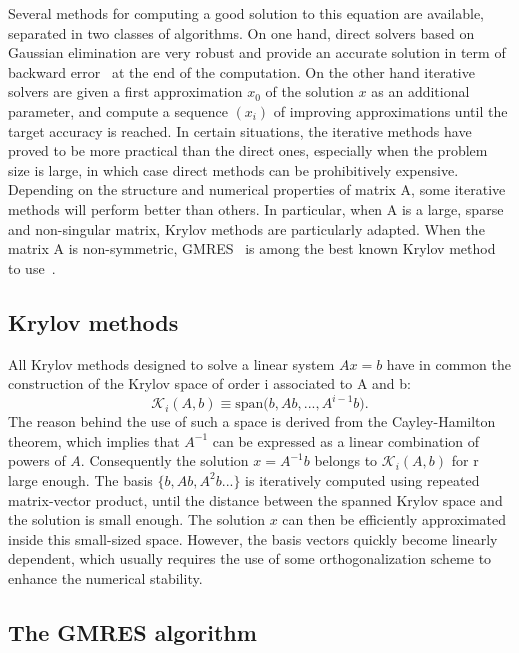 \documentclass[twoside]{article}
\begin{document}
Several methods for computing a good solution to this equation are available, separated in two classes of algorithms. On one hand, direct solvers based on Gaussian elimination \cite{direct_solver} are very robust and provide an accurate solution in term of backward error~\cite{hig:02} 
at the end of the computation. On the other hand iterative solvers are given a first approximation $x_0$ of the solution $x$ as an additional parameter, and compute a sequence $(x_i)$ of improving approximations until the target accuracy is reached. In certain situations, the iterative methods have proved to be more practical than the direct ones, especially when the problem size is large, in which case direct methods can be prohibitively expensive. Depending on the structure and numerical properties of matrix A, some iterative methods will perform better than others. In particular, when A is a large, sparse and non-singular matrix, Krylov methods are particularly adapted. When the matrix A is non-symmetric, GMRES~\cite{gmres} is among the best known Krylov method to use~\cite{Saad:2003}.

\subsection{Krylov methods}
All Krylov methods designed to solve a linear system $Ax = b$ have in common the construction of the Krylov space of order i associated to A and b: $$\mathcal{K}_i(A, b) \equiv \text{span(}b, Ab, ..., A^{i-1}b\text{)}.$$ The reason behind the use of such a space is derived from the Cayley-Hamilton theorem, which implies that $A^{-1}$ can be expressed as a linear combination of powers of $A$. Consequently the solution $x = A^{-1}b$ belongs to $\mathcal{K}_i(A, b)$ for r large enough. The basis $\{b, Ab, A^2b...\}$ is iteratively computed using repeated matrix-vector product, until the distance between the spanned Krylov space and the solution is small enough. The solution $x$ can then be efficiently approximated inside this small-sized space. However, the basis vectors quickly become linearly dependent, which usually requires the use of some orthogonalization scheme to enhance the numerical stability.

\subsection{The GMRES algorithm}
\end{document}
